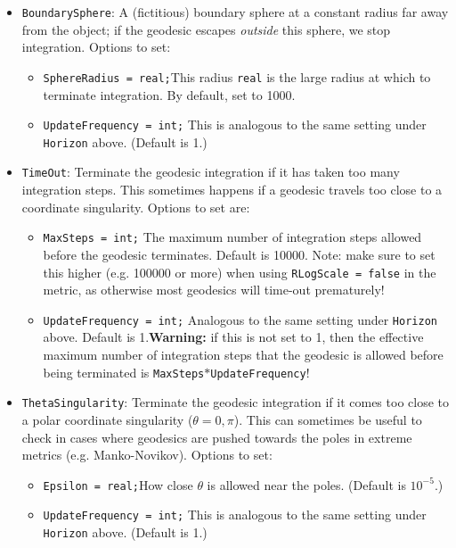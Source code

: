 \documentclass[11pt,a4paper]{article}
\newcommand{\code}[1]{{\tt #1}}
\begin{document}
\begin{itemize}
 \item \code{BoundarySphere}: A (fictitious) boundary sphere at a constant radius far away from the object; if the geodesic escapes \emph{outside} this sphere, we stop integration. Options to set:
 \begin{itemize}
 \item \code{SphereRadius = real;}\newline This radius \code{real} is the large radius at which to terminate integration. By default, set to 1000.
 \item \code{UpdateFrequency = int;} \newline This is analogous to the same setting under \code{Horizon} above. (Default is 1.)
 \end{itemize}
 
 \item \code{TimeOut}: Terminate the geodesic integration if it has taken too many integration steps. This sometimes happens if a geodesic travels too close to a coordinate singularity. Options to set are:
 \begin{itemize}
 \item \code{MaxSteps = int;} \newline The maximum number of integration steps allowed before the geodesic terminates. Default is 10000. Note: make sure to set this higher (e.g. 100000 or more) when using \code{RLogScale = false} in the metric, as otherwise most geodesics will time-out prematurely!
 \item \code{UpdateFrequency = int;} \newline Analogous to the same setting under \code{Horizon} above. Default is 1.\newline \textbf{Warning:} if this is not set to 1, then the effective maximum number of integration steps that the geodesic is allowed before being terminated is \code{MaxSteps}$*$\code{UpdateFrequency}!
\end{itemize}

\item \code{ThetaSingularity}: Terminate the geodesic integration if it comes too close to a polar coordinate singularity ($\theta=0,\pi$). This can sometimes be useful to check in cases where geodesics are pushed towards the poles in extreme metrics (e.g. Manko-Novikov). Options to set:
 \begin{itemize}
 \item \code{Epsilon = real;}\newline How close $\theta$ is allowed near the poles. (Default is $10^{-5}$.)
 \item \code{UpdateFrequency = int;} \newline This is analogous to the same setting under \code{Horizon} above. (Default is 1.)
 \end{itemize}
 

\end{itemize}
\end{document}
